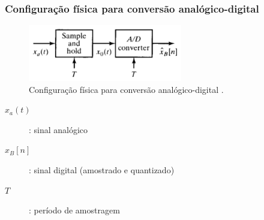 \begin{frame}%
  \frametitle{Configuração física para conversão analógico-digital}

  \begin{figure}[h!]
  \centering
  \includegraphics[width=0.6\textwidth]{images/oppenheim_fig445.png}
  \caption{Configuração física para conversão analógico-digital \citep{oppenheim2009}.}
  \label{fig:oppenheim_fig445}
  \end{figure}

  \begin{description}
  \item[$x_a(t)$]: sinal analógico
  \item[{$\hat{x}_{B}[n]$}]: sinal digital (amostrado e quantizado)
  \item[$T$]: período de amostragem
  \end{description}

\end{frame}



